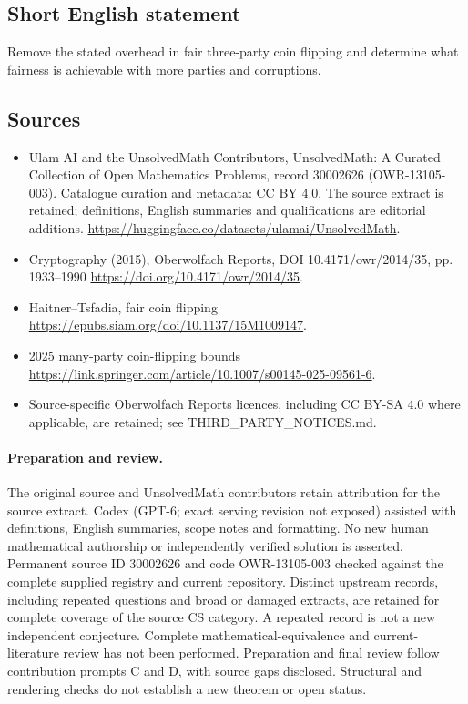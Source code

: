 \documentclass[11pt]{article}
\begin{document}
\subsection{Short English statement}
Remove the stated overhead in fair three-party coin flipping and determine what fairness is achievable with more parties and corruptions.
\subsection{Sources}
\begin{itemize}
\item[\hypertarget{source:30002626:1}{S1}] Ulam AI and the UnsolvedMath Contributors, UnsolvedMath: A Curated Collection of Open Mathematics Problems, record 30002626 (OWR-13105-003). Catalogue curation and metadata: CC BY 4.0. The source extract is retained; definitions, English summaries and qualifications are editorial additions.
\url{https://huggingface.co/datasets/ulamai/UnsolvedMath}.
\item[\hypertarget{source:30002626:2}{S2}] Cryptography (2015), Oberwolfach Reports, DOI 10.4171/owr/2014/35, pp. 1933--1990
\url{https://doi.org/10.4171/owr/2014/35}.
\item[\hypertarget{source:30002626:3}{S3}] Haitner--Tsfadia, fair coin flipping
\url{https://epubs.siam.org/doi/10.1137/15M1009147}.
\item[\hypertarget{source:30002626:4}{S4}] 2025 many-party coin-flipping bounds
\url{https://link.springer.com/article/10.1007/s00145-025-09561-6}.
\item Source-specific Oberwolfach Reports licences, including CC BY-SA 4.0 where applicable, are retained; see THIRD\_PARTY\_NOTICES.md.
\end{itemize}
\paragraph{Preparation and review.}
The original source and UnsolvedMath contributors retain attribution for the source extract. Codex (GPT-6; exact serving revision not exposed) assisted with definitions, English summaries, scope notes and formatting. No new human mathematical authorship or independently verified solution is asserted. Permanent source ID 30002626 and code OWR-13105-003 checked against the complete supplied registry and current repository. Distinct upstream records, including repeated questions and broad or damaged extracts, are retained for complete coverage of the source CS category. A repeated record is not a new independent conjecture. Complete mathematical-equivalence and current-literature review has not been performed. Preparation and final review follow contribution prompts C and D, with source gaps disclosed. Structural and rendering checks do not establish a new theorem or open status.
\label{end:30002626}
\end{document}
